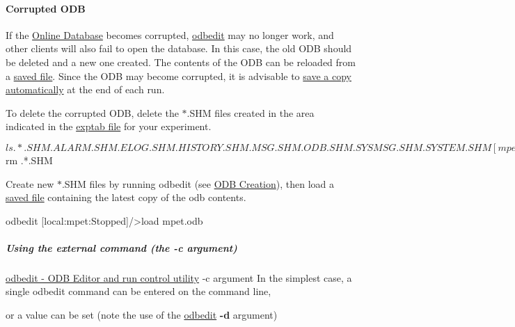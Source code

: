 \hypertarget{RC_odbedit_examples_RC_odbedit_corrupted}{}\paragraph{Corrupted ODB}\label{RC_odbedit_examples_RC_odbedit_corrupted}
If the \hyperlink{F_MainElements_F_Online_Database_overview}{Online Database} becomes corrupted, \hyperlink{RC_odbedit_utility}{odbedit} may no longer work, and other clients will also fail to open the database. In this case, the old ODB should be deleted and a new one created. The contents of the ODB can be reloaded from a \hyperlink{RC_odbedit_examples_RC_odbedit_save}{saved file}. Since the ODB may become corrupted, it is advisable to \hyperlink{F_Logging_Data_F_Logger_ODB_Dump}{save a copy automatically} at the end of each run. \par
 To delete the corrupted ODB, delete the $\ast$.SHM files created in the area indicated in the \hyperlink{Q_Linux_Q_Linux_Exptab}{exptab file} for your experiment. 
\begin{DoxyCode}
$ ls .*.SHM
.ALARM.SHM  .ELOG.SHM  .HISTORY.SHM  .MSG.SHM  .ODB.SHM  .SYSMSG.SHM  .SYSTEM.SHM
      
[mpet@titan01 ~/online]$ rm .*.SHM
\end{DoxyCode}
 Create new $\ast$.SHM files by running odbedit (see \hyperlink{RC_odbedit_examples_RC_odbedit_create_ODB}{ODB Creation}), then load a \hyperlink{RC_odbedit_examples_RC_odbedit_save}{saved file} containing the latest copy of the odb contents. 
\begin{DoxyCode}
 odbedit
[local:mpet:Stopped]/>load mpet.odb
\end{DoxyCode}


\par
 

 \par


\label{RC_odbedit_examples_idx_script_odbedit}
\hypertarget{RC_odbedit_examples_idx_script_odbedit}{}
 \label{RC_odbedit_examples_idx_odbedit_scripts}
\hypertarget{RC_odbedit_examples_idx_odbedit_scripts}{}
\hypertarget{RC_odbedit_examples_RC_odbedit_extcommand}{}\subparagraph{Using the external command (the  -\/c argument)}\label{RC_odbedit_examples_RC_odbedit_extcommand}
\hyperlink{RC_odbedit_utility}{odbedit -\/ ODB Editor and run control utility} -\/c argument In the simplest case, a single odbedit command can be entered on the command line, 
 or a value can be set (note the use of the \hyperlink{RC_odbedit_utility}{odbedit} {\bfseries -\/d} argument) 


